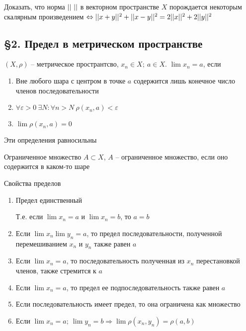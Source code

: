 \documentclass[12pt]{article}
\begin{document}
\begin{Exercise}{}
    Доказать, что норма $|| \  ||$ в векторном пространстве $X$ порождается некоторым скалярным произведением $\Leftrightarrow || x + y ||^2 + || x - y ||^2 = 2|| x ||^2 + 2|| y ||^2$
\end{Exercise}

\subsection{\S 2. Предел в метрическом пространстве}

\begin{defin}{}
    $(X, \rho)$ -- метрическое пространтсво, $x_n \in X;\ a \in X$. $\lim x_n = a$, если

    \begin{enumerate}
        \item Вне любого шара с центром в точке $a$ содержится лишь конечное число членов последовательности
        \item $\forall \varepsilon > 0\ \exists N : \forall n > N\ \rho(x_n, a) < \varepsilon$
        \item $\lim \rho(x_n, a) = 0$
    \end{enumerate}
\end{defin}

\begin{theo}{}
    Эти определения равносильны 
\end{theo}

\begin{defin}{Ограниченное множество}
    $A \subset X$, $A$ -- ограниченное множество, если оно содержится в каком-то шаре
\end{defin}

\begin{nota}{Свойства пределов}
    \begin{enumerate}
        \item Предел единственный
        
        Т.е. если $\lim x_n = a$ и $\lim x_n = b$, то $a = b$

        \item Если $\lim x_n \lim y_n = a$, то предел последовательности, полученной перемешиванием $x_n$ и $y_n$ также равен $a$
        
        \item Если $\lim x_n = a$, то последовательность полученная из $x_n$ перестановкой членов, также стремится к $a$
        
        \item Если $\lim x_n = a$, то предел ее подпоследовательность также равен $a$
        
        \item Если последовательность имеет предел, то она ограничена как множество
        \item Если $\lim x_n = a;\ \lim y_n = b \Rightarrow \lim \rho(x_n, y_n) = \rho(a, b)$
    \end{enumerate}
\end{nota}
\end{document}
